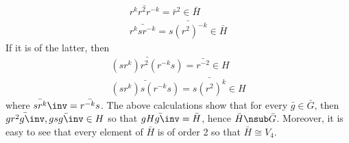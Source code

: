 \begin{problems}
\begin{solalph}
\begin{align*}
            \bar{r^kr^2r^{-k}} = \bar r^2 \in \bar H \\
            \bar{r^ksr^{-k}} = \bar{s(r^2)^{-k}} \in \bar H
        \end{align*}
        If it is of the latter, then
        \begin{align*}
            \bar{(sr^k)r^2(r^{-k}s)} = \bar{r^{-2}} \in H \\
            \bar{(sr^k)s(r^{-k}s)} = \bar{s(r^2)^k} \in H
        \end{align*}
        where $\bar{sr^k}\inv = \bar{r^{-k}s}$. The above calculations show that for every $\bar g \in \bar G$, then $\bar{gr^2g\inv}, \bar{gsg\inv} \in H$ so that $\bar{gHg\inv} = \bar H$, hence $\bar H \nsub \bar G$. Moreover, it is easy to see that every element of $\bar H$ is of order 2 so that $\bar H \cong V_4$.


\end{solalph}
\end{problems}
